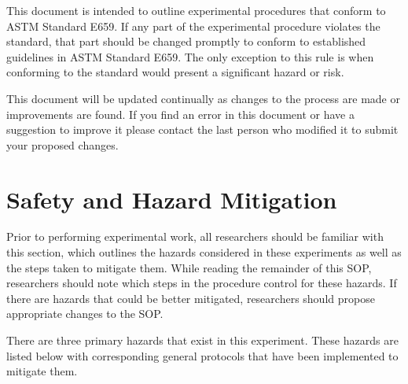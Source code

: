 \documentclass[letterpaper,11pt]{article}
\begin{document}
This document is intended to outline experimental procedures that conform to
ASTM Standard E659. If any part of the experimental procedure violates the 
standard, that part should be changed promptly to conform to established 
guidelines in ASTM Standard E659. The only exception to this rule is when 
conforming to the standard would present a significant hazard or risk.

This document will be updated continually as changes to the process are made or 
improvements are found. If you find an error in this document or have a 
suggestion to improve it please contact the last person who modified it to 
submit your proposed changes.

\section{Safety and Hazard Mitigation}
Prior to performing experimental work, all researchers should be familiar with
this section, which outlines the hazards considered in these 
experiments as well as the steps taken to mitigate them. While reading the 
remainder of this SOP, researchers should note which steps in the procedure 
control for these hazards. If there are hazards that could be better mitigated, 
researchers should propose appropriate changes to the SOP.

There are three primary hazards that exist in this experiment. These hazards are
listed below with corresponding general protocols that have been implemented to 
mitigate them.
\end{document}
